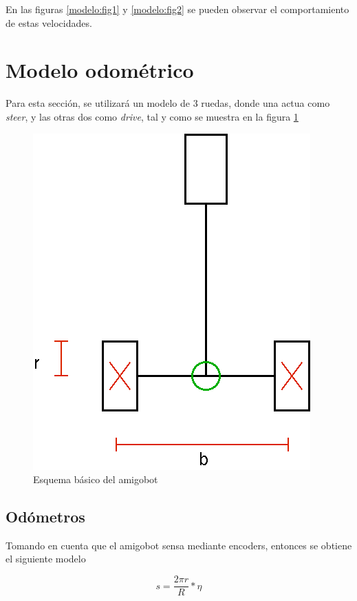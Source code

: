 \documentclass[spanish,10pt,letterpaper, twocolumn]{article}
\begin{document}
En las figuras \ref{modelo:fig1} y \ref{modelo:fig2} se pueden observar el comportamiento de estas velocidades.

\section{Modelo odom\'etrico}
Para esta secci\'on, se utilizar\'a un modelo de 3 ruedas, donde una actua como \textit{steer}, y las otras dos como \textit{drive}, tal y como se muestra en la figura \ref{fig:fig1}

\begin{figure}[ht]
\centering
\includegraphics[scale=0.2]{carro.png}
\caption{Esquema b\'asico del amigobot}
\label{fig:fig1}
\end{figure}



\subsection{Od\'ometros}
Tomando en cuenta que el amigobot sensa mediante encoders, entonces se obtiene el siguiente modelo

\begin{equation}
	\label{eq:eq10}
	s=\frac{2\pi r}{R}* \eta
\end{equation}
\end{document}
